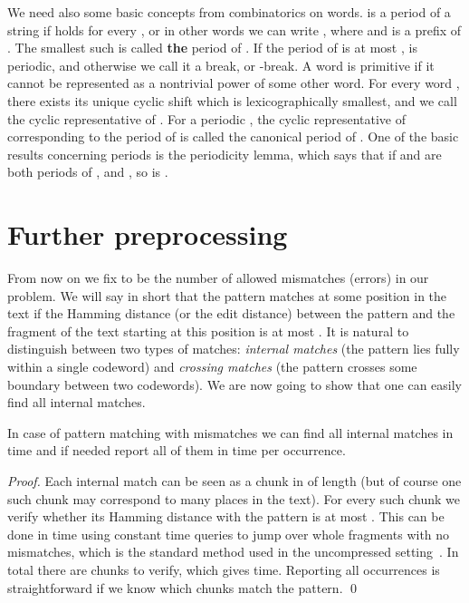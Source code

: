 \documentclass[runningheads]{llncs}
\begin{document}
We need also some basic concepts from combinatorics on words.  is a period of a string  if  holds for every , or in other words
we can write , where  and  is a prefix of . The smallest such 
is called {\bf the} period of . If the period of  is at most ,  is periodic, and otherwise we call it a break, or -break. A word is primitive if it cannot be
represented as a nontrivial power of some other word. For every word , there exists its unique cyclic shift  which is lexicographically smallest, and we call 
the cyclic representative of . For a periodic , the cyclic representative of  corresponding to the period of  is called the canonical period of . One of the basic
results concerning periods is the periodicity lemma, which says that if  and  are both periods of , and , so is .

\section{Further preprocessing}
\label{section:further}

From now on we fix  to be the number of allowed mismatches (errors) in our problem. We will say in short that the pattern matches at some position in the text if the Hamming distance (or the edit distance) between the pattern and the fragment of the text starting at this position is at most . It is natural to distinguish between two types of matches: {\it internal matches} (the pattern lies fully within a single codeword) and  {\it crossing matches} (the pattern crosses some boundary between two codewords). We are now going to show that one can easily find all internal matches. 


\begin{lemma}\label{lemma:internal_matches}
In case of pattern matching with mismatches we can find all internal matches in  time and if needed report all of them in  time per occurrence.
\end{lemma}
\begin{proof}
Each internal match can be seen as a chunk in  of length  (but of course one such chunk may correspond to many places in the text). For every such chunk we verify whether its Hamming distance with the pattern is at most . This can be done in  time using constant time  queries to jump over whole fragments with no mismatches, which is the standard method used in the uncompressed setting~\cite{LandauMismatches}. In total there are  chunks to verify, which gives  time. Reporting all occurrences is straightforward if we know which chunks match the pattern.
\qed
\end{proof}
\end{document}
